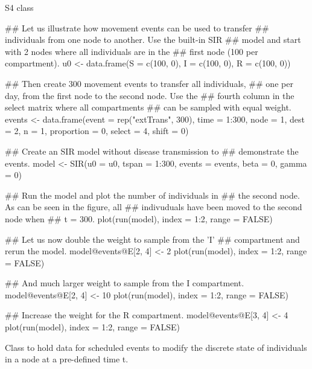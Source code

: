 \documentclass[letterpaper]{book}
\begin{document}
%
\begin{Value}
S4 class 
\end{Value}
%
\begin{Examples}
\begin{ExampleCode}
## Let us illustrate how movement events can be used to transfer
## individuals from one node to another.  Use the built-in SIR
## model and start with 2 nodes where all individuals are in the
## first node (100 per compartment).
u0 <- data.frame(S = c(100, 0), I = c(100, 0), R = c(100, 0))

## Then create 300 movement events to transfer all individuals,
## one per day, from the first node to the second node. Use the
## fourth column in the select matrix where all compartments
## can be sampled with equal weight.
events <- data.frame(event      = rep("extTrans", 300),
                     time       = 1:300,
                     node       = 1,
                     dest       = 2,
                     n          = 1,
                     proportion = 0,
                     select     = 4,
                     shift      = 0)

## Create an SIR model without disease transmission to
## demonstrate the events.
model <- SIR(u0      = u0,
             tspan  = 1:300,
             events = events,
             beta   = 0,
             gamma  = 0)

## Run the model and plot the number of individuals in
## the second node.  As can be seen in the figure, all
## indivuduals have been moved to the second node when
## t = 300.
plot(run(model), index = 1:2, range = FALSE)

## Let us now double the weight to sample from the 'I'
## compartment and rerun the model.
model@events@E[2, 4] <- 2
plot(run(model), index = 1:2, range = FALSE)

## And much larger weight to sample from the I compartment.
model@events@E[2, 4] <- 10
plot(run(model), index = 1:2, range = FALSE)

## Increase the weight for the R compartment.
model@events@E[3, 4] <- 4
plot(run(model), index = 1:2, range = FALSE)
\end{ExampleCode}
\end{Examples}
%
\begin{Description}
Class to hold data for scheduled events to modify the discrete
state of individuals in a node at a pre-defined time t.
\end{Description}
\end{document}
